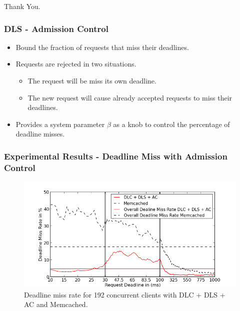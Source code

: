 \documentclass{beamer}
\begin{document}
\begin{frame}
  \centerline{Thank You.}
\end{frame}

\begin{frame}
  \frametitle{DLS - Admission Control}
  \begin{itemize}
  \item Bound the fraction of requests that miss their deadlines.
  \item Requests are rejected in two situations.
    \begin{itemize}
    \item The request will be miss its own deadline.
    \item The new request will cause already accepted requests to miss their deadlines.
    \end{itemize}
  \item Provides a system parameter $\beta$ as a knob to control the percentage
    of deadline misses.
  \end{itemize}
\end{frame}

\begin{frame}
  \frametitle{Experimental Results - Deadline Miss with Admission Control}
  \begin{figure}[t]
    \begin{center}
      \centerline{\includegraphics[scale=0.5]{img/EC2/EC2_AC_MM/miss_48.png}}
      \caption{Deadline miss rate for 192 concurrent clients with DLC + DLS + AC and Memcached.}
      \label{fig:miss_192_ac_mm}
    \end{center}
  \end{figure}
\end{frame}
\end{document}
